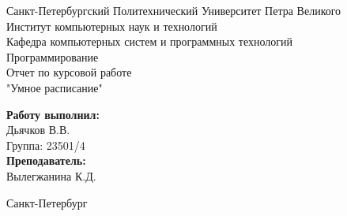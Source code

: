\begin{titlepage}	%

	\begin{center}		%

		\large Санкт-Петербургский Политехнический Университет Петра Великого\\
		\large Институт компьютерных наук и технологий \\
		\large Кафедра компьютерных систем и программных технологий\\[6cm]
		
		\huge Программирование\\[0.5cm] %
		\large Отчет по курсовой работе\\[0.1cm]
		\large "Умное расписание"\\[5cm]

	\end{center}


	\begin{flushright} %
		\begin{minipage}{0.25\textwidth} %
			\begin{flushleft} %

				\large\textbf{Работу выполнил:}\\
				\large Дьячков В.В.\\
				\large {Группа:} 23501/4\\
				
				\large \textbf{Преподаватель:}\\
				\large Вылегжанина К.Д.

			\end{flushleft}
		\end{minipage}
	\end{flushright}
	
	\vfill %

	\begin{center}
	\large Санкт-Петербург\\
	\large \the\year %
	\end{center} %

\thispagestyle{empty} %
\end{titlepage} %

\vfill %
